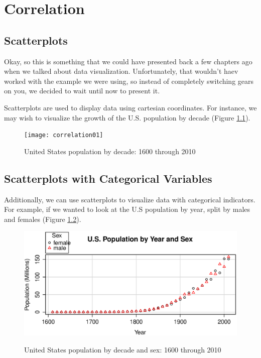 
\chapter{Correlation}

\section{Scatterplots}
Okay, so this is something that we could have presented back a few chapters ago when we talked about data visualization. Unfortunately, that wouldn't haev worked with the example we were using, so instead of completely switching gears on you, we decided to wait until now to present it.

Scatterplots are used to display data using cartesian coordinates. For instance, we may wish to visualize the growth of the U.S. population by decade (Figure \ref{fig:correlation01}).

\begin{figure}
\texttt{[image: correlation01]}
\label{fig:correlation01}
\caption{United States population by decade: 1600 through 2010}
\end{figure}

\section{Scatterplots with Categorical Variables}
Additionally, we can use scatterplots to visualize data with categorical indicators. For example, if we wanted to look at the U.S population by year, split by males and females (Figure \ref{fig:correlation02}).

\begin{figure}
\includegraphics[width=35pc]{assets/correlation02}
\label{fig:correlation02}
\caption{United States population by decade and sex: 1600 through 2010}
\end{figure}

